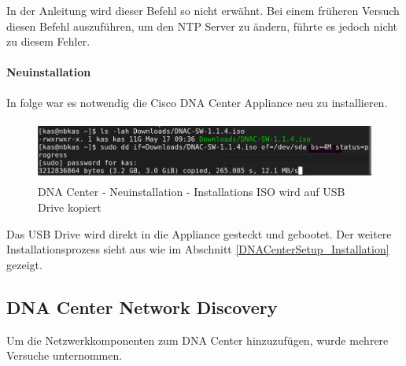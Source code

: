 In der Anleitung wird dieser Befehl so nicht erwähnt. Bei einem früheren Versuch diesen Befehl auszuführen, um den NTP Server zu ändern, führte es jedoch nicht zu diesem Fehler. 

\paragraph{Neuinstallation}
In folge war es notwendig die Cisco DNA Center Appliance neu zu installieren. 

\begin{figure}[H]
	\centering
	\includegraphics[height=2cm]{img/dna-center-reset-iso.png}
	\caption{DNA Center - Neuinstallation - Installations ISO wird auf USB Drive kopiert}
	\label{fig:dna-center-iso-1}
\end{figure}

Das USB Drive wird direkt in die Appliance gesteckt und gebootet. Der weitere Installationsprozess sieht aus wie im Abschnitt \ref{DNACenterSetup_Installation} gezeigt. 




\subsection{DNA Center Network Discovery}

Um die Netzwerkkomponenten zum DNA Center hinzuzufügen, wurde mehrere Versuche unternommen. 
